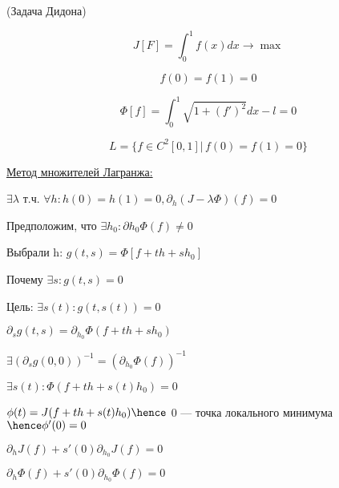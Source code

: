 \begin{example} (Задача Дидона)






\[
    J[F] = \int_0^1 f(x) dx \to \max
\]

\[
    f(0) = f(1) = 0
\]

\[
    \Phi[f] = \int_0^1 \sqrt{1 + (f')^2} dx - l = 0
\]

\[
    L = \{ f \in C^2 [0, 1] |\, f(0) = f(1) = 0 \}
\]

\underline{Метод множителей Лагранжа: } 

$\exists \lambda$ т.ч. $\forall h : h(0) = h(1) = 0, \partial_h(J - \lambda \Phi)(f) = 0$

Предположим, что $\exists h_0 : \partial h_0 \Phi(f) \neq 0$


Выбрали h:
$g(t, s) = \Phi[f + th + sh_0]$

Почему $\exists s : g(t, s) = 0$

Цель: $\exists s(t) : g(t, s(t)) = 0$

$\partial_s g(t, s) = \partial_{h_0} \Phi(f + th + sh_0) $

$\exists (\partial_s g(0, 0)) ^ {-1} = (\partial_{h_0} \Phi (f)) ^ {-1}$

$\exists s(t) : \Phi(f + th + s(t)h_0) = 0$

$\phi(t) = J(f + th + s(t)h_0) \hence$ 0 --- точка локального минимума $\hence \phi'(0) = 0$

$\partial_h J(f) + s'(0) \partial _{h_0} J(f) = 0$

$\partial_h \Phi(f) + s'(0) \partial_{h_0} \Phi(f) = 0$


\end{example}
